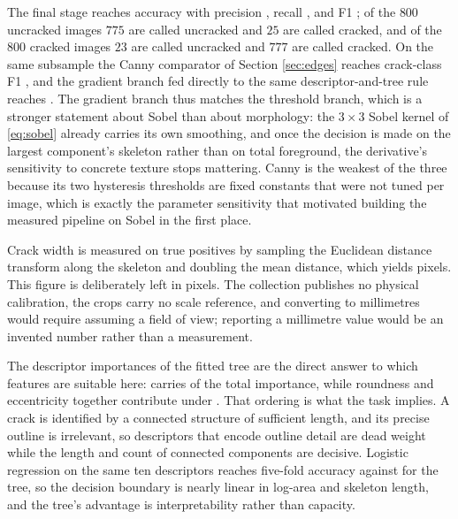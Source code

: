 \documentclass{ieeeaccess}
\begin{document}
The final stage reaches accuracy \crackAcc{} with precision \crackPrec{}, recall
\crackRec{}, and F1 \crackFone{}; of the $800$ uncracked images $775$ are called uncracked and $25$ are called
cracked, and of the $800$ cracked images $23$ are called uncracked and $777$ are
called cracked. On the same subsample the Canny comparator of
Section \ref{sec:edges} reaches crack-class F1 \crackCannyFone{}, and the gradient
branch fed directly to the same descriptor-and-tree rule reaches
\crackSobelFone{}. The gradient branch thus matches the threshold branch, which
is a stronger statement about Sobel than about morphology: the $3\times3$ Sobel
kernel of \eqref{eq:sobel} already carries its own smoothing, and once the
decision is made on the largest component's skeleton rather than on total
foreground, the derivative's sensitivity to concrete texture stops mattering.
Canny is the weakest of the three because its two hysteresis thresholds are fixed
constants that were not tuned per image, which is exactly the parameter
sensitivity that motivated building the measured pipeline on Sobel in the first
place.

Crack width is measured on true positives by sampling the Euclidean distance
transform along the skeleton and doubling the mean distance, which yields
\crackWidth{} pixels. This figure is deliberately left in pixels. The collection
publishes no physical calibration, the crops carry no scale reference, and
converting to millimetres would require assuming a field of view; reporting a
millimetre value would be an invented number rather than a measurement.

The descriptor importances of the fitted tree are the direct answer to which
features are suitable here: \crackTopFeat{} carries \crackTopImportance{} of the
total importance, while roundness and eccentricity together contribute under
\crackLowImportance{}. That ordering is what the task implies. A crack is
identified by a connected structure of sufficient length, and its precise outline
is irrelevant, so descriptors that encode outline detail are dead weight while the
length and count of connected components are decisive. Logistic regression on the
same ten descriptors reaches \crackLogCV{} five-fold accuracy against
\crackTreeCV{} for the tree, so the decision boundary is nearly linear in log-area
and skeleton length, and the tree's advantage is interpretability rather than
capacity.
\end{document}
